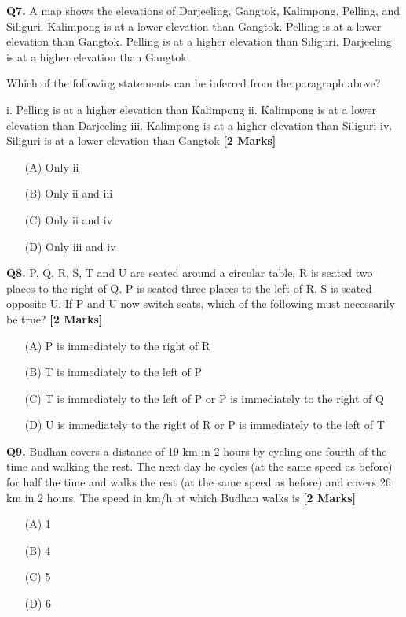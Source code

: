 \documentclass[11pt]{article}
\newcommand{\questionb}[2]{
    \noindent\textbf{Q#2.} #1 \hfill \textbf{[2 Marks]}
}
\begin{document}
\questionb{A map shows the elevations of Darjeeling, Gangtok, Kalimpong, Pelling, and Siliguri.  
Kalimpong is at a lower elevation than Gangtok. Pelling is at a lower elevation than Gangtok.  
Pelling is at a higher elevation than Siliguri. Darjeeling is at a higher elevation than Gangtok.

Which of the following statements can be inferred from the paragraph above?

i. Pelling is at a higher elevation than Kalimpong  
ii. Kalimpong is at a lower elevation than Darjeeling  
iii. Kalimpong is at a higher elevation than Siliguri  
iv. Siliguri is at a lower elevation than Gangtok}{7}
\begin{enumerate}
    \item[(A)] Only ii    
    \item[(B)] Only ii and iii    
    \item[(C)] Only ii and iv    
    \item[(D)] Only iii and iv  
\end{enumerate}
\vspace{0.5cm}

\questionb{P, Q, R, S, T and U are seated around a circular table, R is seated two places to the right of Q. P is seated three places to the left of R. S is seated opposite U. If P and U now switch seats, which of the following must necessarily be true?}{8}
\begin{enumerate}
    \item[(A)] P is immediately to the right of R  
    \item[(B)] T is immediately to the left of P  
    \item[(C)] T is immediately to the left of P or P is immediately to the right of Q  
    \item[(D)] U is immediately to the right of R or P is immediately to the left of T  
\end{enumerate}
\vspace{0.5cm}

\questionb{Budhan covers a distance of 19 km in 2 hours by cycling one fourth of the time and walking the rest. The next day he cycles (at the same speed as before) for half the time and walks the rest (at the same speed as before) and covers 26 km in 2 hours. The speed in km/h at which Budhan walks is}{9}
\begin{enumerate}
    \item[(A)] 1    
    \item[(B)] 4    
    \item[(C)] 5    
    \item[(D)] 6
\end{enumerate}
\vspace{0.5cm}
\end{document}
